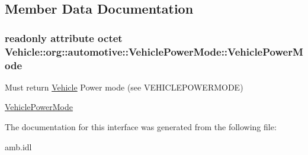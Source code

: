 \subsection{Member Data Documentation}
\hypertarget{interfaceVehicle_1_1org_1_1automotive_1_1VehiclePowerMode_a3fbcbda3857e093c4e0970f6b2b3d1c3}{
\subsubsection[{Vehicle\-Power\-Mode}]{\setlength{\rightskip}{0pt plus 5cm}readonly attribute octet Vehicle\-::org\-::automotive\-::\-Vehicle\-Power\-Mode\-::\-Vehicle\-Power\-Mode}}\label{interfaceVehicle_1_1org_1_1automotive_1_1VehiclePowerMode_a3fbcbda3857e093c4e0970f6b2b3d1c3}


Must return \hyperlink{namespaceVehicle}{Vehicle} Power mode (see V\-E\-H\-I\-C\-L\-E\-P\-O\-W\-E\-R\-M\-O\-D\-E) 

\hyperlink{interfaceVehicle_1_1org_1_1automotive_1_1VehiclePowerMode}{Vehicle\-Power\-Mode} 

The documentation for this interface was generated from the following file\-:\begin{DoxyCompactItemize}
\item 
amb.\-idl\end{DoxyCompactItemize}
